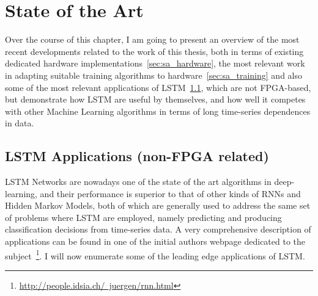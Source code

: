 \chapter{State of the Art}\label{chap:stateArt}

Over the course of this chapter, I am going to present an overview of the most recent developments related to the work of this thesis, both in terms of existing dedicated hardware implementations~\ref{sec:sa_hardware}, the most relevant work in adapting suitable training algorithms to hardware~\ref{sec:sa_training} and also some of the most relevant applications of LSTM~\ref{sec:sa_apps}, which are not FPGA-based, but demonstrate how LSTM are useful by themselves, and how well it competes with other Machine Learning algorithms in terms of long time-series dependences in data.

\section{LSTM Applications (non-FPGA related)}\label{sec:sa_apps} 
LSTM Networks are nowadays one of the state of the art algorithms in deep-learning, and their performance is superior to that of other kinds of RNNs and Hidden Markov Models, both of which are generally used to address the same set of problems where LSTM are employed, namely predicting and producing classification decisions from time-series data. A very comprehensive description of applications can be found in one of the initial authors webpage dedicated to the subject~\footnote{\href{http://people.idsia.ch/~juergen/rnn.html}{http://people.idsia.ch/~juergen/rnn.html}}. I will now enumerate some of the leading edge applications of LSTM.

